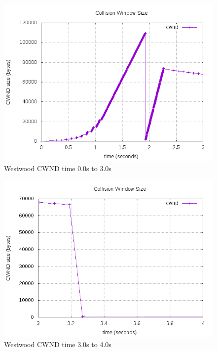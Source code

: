 \documentclass{article}
\begin{document}
\begin{figure}[H]
\centering
 \includegraphics[width=12cm]{figures/cwndWestwood_1.png}
\caption{Westwood CWND time 0.0s to 3.0s}
\end{figure}



\begin{figure}[H]
\centering
 \includegraphics[width=12cm]{figures/cwndWestwood_2.png}
\caption{Westwood CWND time 3.0s to 4.0s}
\end{figure}
\end{document}
